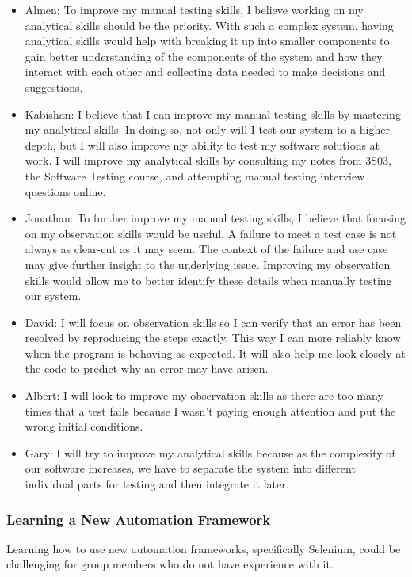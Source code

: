 \documentclass[12pt, titlepage]{article}
\begin{document}
\begin{itemize}
    \item Almen: To improve my manual testing skills, I believe working on my
    analytical skills should be the priority. With such a complex system, having
    analytical skills would help with breaking it up into smaller components to
    gain better understanding of the components of the system and how they
    interact with each other and collecting data needed to make decisions and
    suggestions.
    \item Kabishan: I believe that I can improve my manual testing skills by
    mastering my analytical skills. In doing so, not only will I test our system
    to a higher depth, but I will also improve my ability to test my software
    solutions at work. I will improve my analytical skills by consulting my
    notes from 3S03, the Software Testing course, and attempting manual testing
    interview questions online.
    \item Jonathan: To further improve my manual testing skills, I believe that
    focusing on my observation skills would be useful. A failure to meet a test
    case is not always as clear-cut as it may seem. The context of the failure
    and use case may give further insight to the underlying issue. Improving my
    observation skills would allow me to better identify these details when
    manually testing our system.
    \item David: I will focus on observation skills so I can verify that an
    error has been resolved by reproducing the steps exactly. This way I can
    more reliably know when the program is behaving as expected. It will also
    help me look closely at the code to predict why an error may have arisen.
    \item Albert: I will look to improve my observation skills as there are too
    many times that a test fails because I wasn't paying enough attention and
    put the wrong initial conditions.
    \item Gary: I will try to improve my analytical skills because as the
    complexity of our software increases, we have to separate the system into
    different individual parts for testing and then integrate it later.
\end{itemize}

\subsubsection{Learning a New Automation Framework}
Learning how to use new automation frameworks, specifically Selenium, could be
challenging for group members who do not have experience with it.\\
\end{document}

